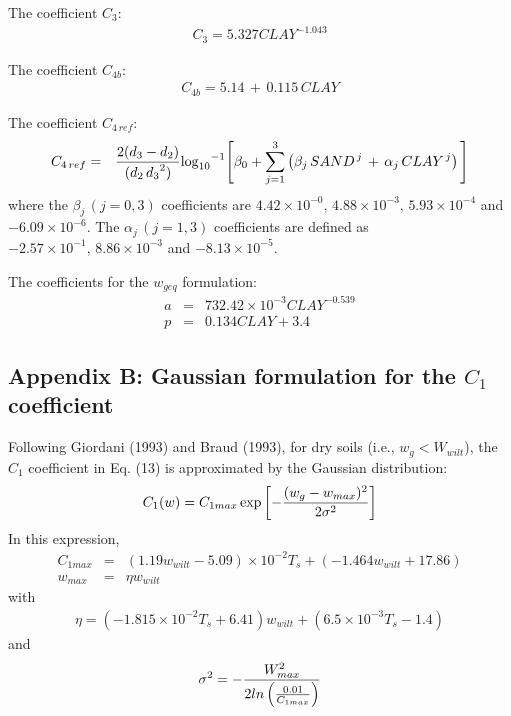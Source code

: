 {The coefficient $C_3$:
\begin{eqnarray}
C_3 = 5.327 CLAY^{-1.043}
\end{eqnarray}

The coefficient $C_{4b}$:
\begin{eqnarray}
C_{4b} = 5.14 \,+\,0.115 \, CLAY
\end{eqnarray}

The coefficient $C_{4\,ref}$:
\begin{eqnarray}
C_{4\, ref} &=& {2(d_3-d_2)\over (d_2\,{d_3}^2)}
{\rm {log}_{10}}^{-1}
\Bigg[
\beta_0 +
\sum_{j=1}^3 \left( \beta_j \,{SAND}^{\,j} \,+\,
\alpha_j \,{CLAY}^{\,j} \right)
\Bigg]
\end{eqnarray}
%
where the $\beta_j \,(j=0,3)$ coefficients are
$4.42 \times {10}^{-0},\, 4.88 \times {10}^{-3},\,
5.93 \times {10}^{-4}$ and $-6.09 \times {10}^{-6}$.
The $\alpha_j \,(j=1,3)$ coefficients are defined as
$-2.57 \times {10}^{-1} ,\,
8.86 \times {10}^{-3}$ and
$-8.13 \times {10}^{-5}$.

The coefficients for the $w_{geq}$ formulation:
\begin{eqnarray}
a&=&732.42 \times 10^{-3} CLAY^{-0.539} \\
p&=&0.134 CLAY + 3.4
\end{eqnarray}

\subsection{Appendix B: Gaussian formulation for the $C_1$
  coefficient}
\label{app:gaus_form_c1}

Following Giordani (1993) and Braud \etal (1993),
for dry soils (i.e., $w_g < W_{wilt}$), the $C_1$ coefficient
in Eq. (13) is approximated by the Gaussian distribution:
\begin{eqnarray}
  C_1(w) = C_{1max} \exp \left[ - {(w_g-w_{max})^2 \over 2 \sigma^2} \right]
\end{eqnarray}
In this expression,
\begin{eqnarray}
  C_{1max} &=& (1.19w_{wilt}-5.09) \times 10^{-2} T_s
           + (-1.464w_{wilt} + 17.86) \\
  w_{max}  &=& \eta w_{wilt}
\end{eqnarray}
with
\begin{eqnarray}
  \eta = (-1.815 \times 10^{-2} T_s + 6.41) w_{wilt}
       + (6.5 \times 10^{-3} T_s -1.4)
\end{eqnarray}
and
\begin{eqnarray}
  \sigma^2 = - {W^2_{max} \over 2 ln \left( {0.01 \over C_{1max} } \right) }
\end{eqnarray}

}

